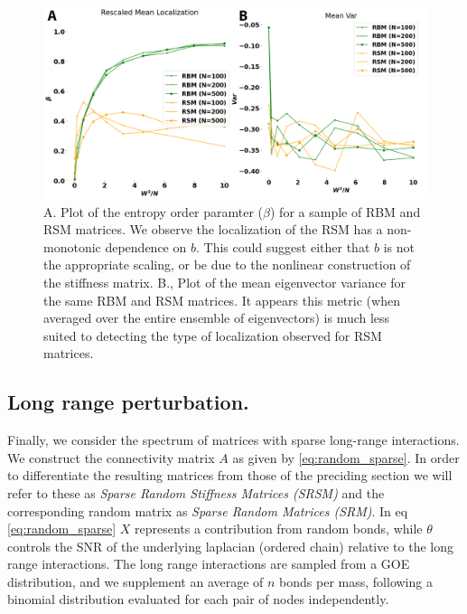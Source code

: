 \documentclass{article}
\begin{document}
\begin{figure}
\begin{center}
	\includegraphics[width=\textwidth]{Figures/RSM_RBM_localization_final.png}
\end{center}
\caption{
A. Plot of the entropy order paramter ($\beta$) for a sample of RBM and RSM matrices. 
We observe the localization of the RSM has a non-monotonic dependence on $b$. 
This could suggest either that $b$ is not the appropriate scaling, or be due to the 
nonlinear construction of the stiffness matrix.
B., Plot of the mean eigenvector variance for the same RBM and RSM matrices. 
It appears this metric (when averaged over the entire ensemble of eigenvectors)
is much less suited to detecting the type of localization observed for RSM matrices.}
\label{fig:RSM_RBM_collapse}
\end{figure}



\subsection{Long range perturbation.}%
\label{sec:sparse}

Finally, we consider the spectrum of matrices with sparse long-range interactions.
We construct the connectivity matrix $A$ as given by \ref{eq:random_sparse}.
In order to differentiate the resulting matrices from those of the preciding section we will refer to these as \textit{Sparse Random Stiffness Matrices (SRSM)} and the corresponding random matrix as \textit{Sparse Random Matrices (SRM)}.
In eq \ref{eq:random_sparse} $X$ represents a contribution from random bonds, while $\theta$ controls the SNR of the
underlying laplacian (ordered chain) relative to the long range interactions.
The long range interactions are sampled from a GOE distribution, and we supplement an average of $n$ bonds per mass, following a binomial distribution evaluated for each pair of nodes independently.
\end{document}

